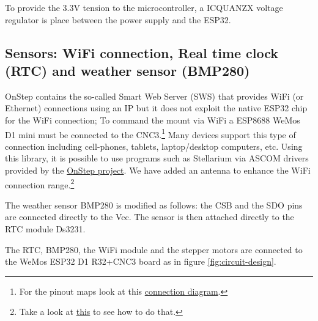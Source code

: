 To provide the 3.3V tension to the microcontroller, a ICQUANZX voltage regulator is place between the power supply and the ESP32.

\subsection{Sensors: WiFi connection, Real time clock (RTC) and weather sensor (BMP280)}
OnStep contains the so-called Smart Web Server (SWS) that provides WiFi (or Ethernet) connections using an IP but it does not exploit the native ESP32 chip for the WiFi connection;
To command the mount via WiFi a ESP8688 WeMos D1 mini must be connected to the CNC3.\footnote{For the pinout maps look at this \href{https://onstep.groups.io/g/main/wiki/19670}{connection diagram}.}
Many devices support this type of connection including cell-phones, tablets, laptop/desktop computers, etc.
Using this library, it is possible to use programs such as Stellarium via ASCOM drivers provided by the \href{http://www.stellarjourney.com/index.php?r=site/software_telescope}{OnStep project}.
We have added an antenna to enhance the WiFi connection range.\footnote{Take a look at \href{https://www.instructables.com/External-Antenna-for-ESP8266/}{this} to see how to do that.}

The weather sensor BMP280 is modified as follows: the CSB and the SDO pins are connected directly to the Vcc.
The sensor is then attached directly to the RTC module Ds3231.

The RTC, BMP280, the WiFi module and the stepper motors are connected to the WeMos ESP32 D1 R32+CNC3 board as in figure \ref{fig:circuit-design}.
